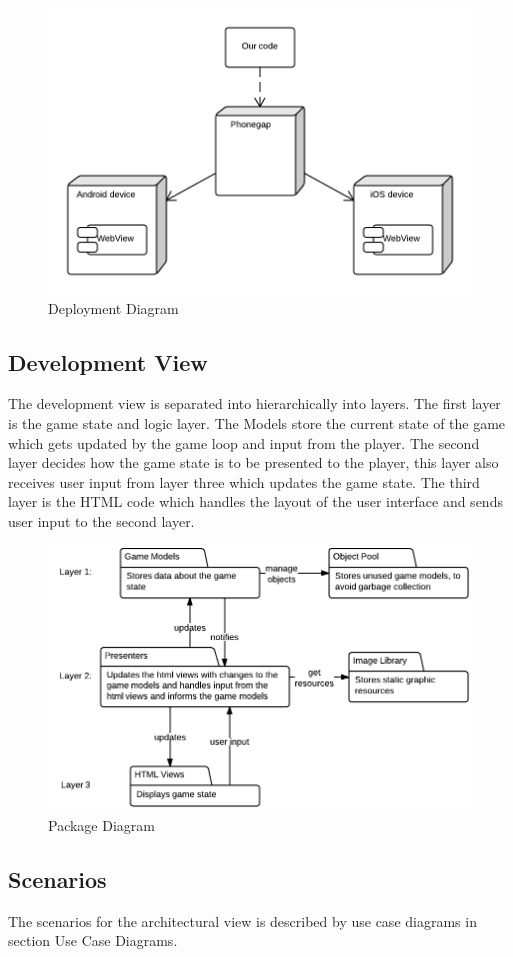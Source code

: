 	\begin{figure}[H]
		\centering
		\includegraphics[width=\textwidth]{pictures/deployment_diagram}
		\caption{Deployment Diagram}
	\end{figure}


\subsection*{Development View}

	The development view is separated into hierarchically into layers. The first layer is the game state 
	and logic layer. The Models store the current state of the game which gets updated by the game loop 
	and input from the player. The second layer decides how the game state is to be presented to the 
	player, this layer also receives user input from layer three which updates the game state. The third 
	layer is the HTML code which handles the layout of the user interface and sends user input to the
	second layer.

	\begin{figure}[H]
		\centering
		\includegraphics[scale=0.5]{pictures/development_view}
		\caption{Package Diagram}
	\end{figure}

\subsection*{Scenarios}
	
	The scenarios for the architectural view is described by use case diagrams in section \label{sec:usecasediagrams} Use Case Diagrams.


